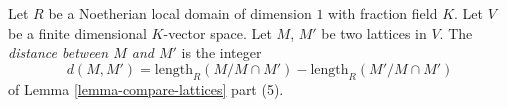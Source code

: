\begin{definition}
\label{definition-distance}
Let $R$ be a Noetherian local domain of dimension $1$ with
fraction field $K$. Let $V$ be a finite dimensional $K$-vector space.
Let $M$, $M'$ be two lattices in $V$. The {\it distance between
$M$ and $M'$} is the integer
$$
d(M, M') = \text{length}_R(M/M \cap M') - \text{length}_R(M'/M \cap M')
$$
of Lemma \ref{lemma-compare-lattices} part (5).
\end{definition}